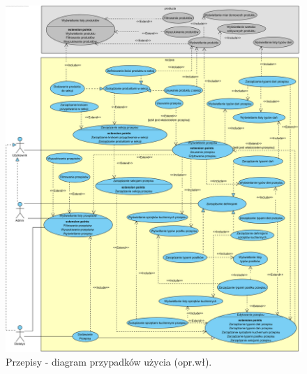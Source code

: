 \begin{minipage}{\textwidth}
    \begin{figure}[H]
        \centering\includegraphics[scale=0.55]{../uml/use_case_diagrams/recipes.png}
        \caption{Przepisy - diagram przypadków użycia (opr.wł).}\label{rysunek:use-case-diagram-recipes}
    \end{figure}
\end{minipage}

